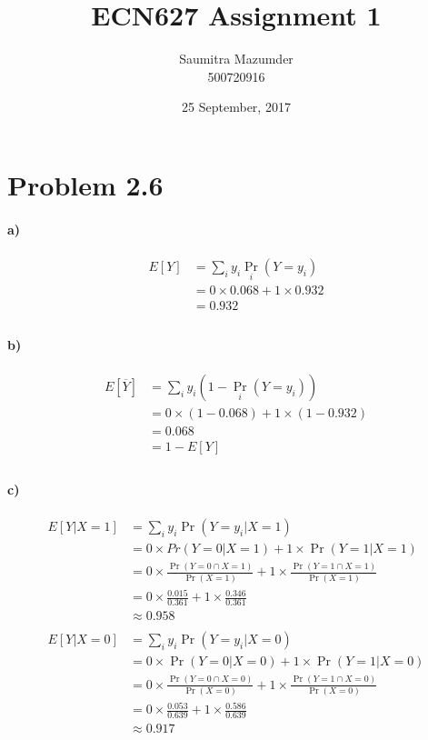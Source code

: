 \documentclass[10pt,letter]{article}
\begin{document}
\title{ECN627 Assignment 1}
\author{Saumitra Mazumder \\500720916}
\date{25 September, 2017}
\maketitle 


\section*{Problem 2.6}
\paragraph{a)}


\begin{align*}
E [Y] &= \sum_{i} y_i \Pr_i(Y=y_i)\\
&= 0\times 0.068 + 1 \times 0.932\\
&= 0.932\\
\end{align*}


\paragraph{b)}
\begin{align*}
E [\overline{Y}] &= \sum_{i} y_i (1-\Pr_i(Y=y_i))\\
&= 0\times (1- 0.068) + 1 \times (1-0.932)\\
&= 0.068\\
&= 1 - E [Y]\\  
\end{align*}

\paragraph{c)} 
\begin{align*}
E[Y|X=1] &= \sum_{i} y_i \Pr(Y=y_i|X=1)\\
&= 0\times Pr(Y=0|X=1) + 1\times \Pr(Y=1|X=1)\\
&= 0\times \frac{\Pr(Y = 0 \cap X=1)}{\Pr(X = 1)} + 1\times \frac{\Pr(Y = 1 \cap X=1)}{\Pr(X = 1)}\\ 
&= 0\times \frac{0.015}{0.361} + 1\times \frac{0.346}{0.361}\\
&\approx 0.958\\
\\
E[Y|X=0] &= \sum_{i} y_i \Pr(Y=y_i|X=0)\\
&= 0\times \Pr(Y=0|X=0) + 1\times \Pr(Y=1|X=0)\\
&= 0\times \frac{\Pr(Y = 0 \cap X=0)}{\Pr(X = 0)} + 1\times \frac{\Pr(Y = 1 \cap X=0)}{\Pr(X = 0)}\\ 
&= 0\times \frac{0.053}{0.639} + 1\times \frac{0.586}{0.639}\\
&\approx 0.917
\end{align*}
\end{document}
